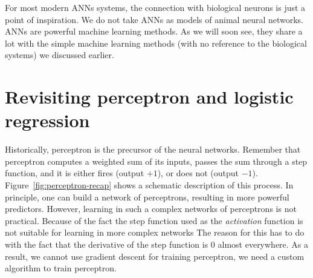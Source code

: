 For most modern ANNs systems,
the connection with biological neurons is just a point of inspiration.
We do not take ANNs as models of animal neural networks.
ANNs are powerful machine learning methods.
As we will soon see, they share a lot with the simple
machine learning methods (with no reference to the biological systems)
we discussed earlier.

\section{Revisiting perceptron and logistic regression}

\begin{marginfigure}
  \centering
  \caption{\label{fig:perceptron-recap}%
    A schematic representation of perceptron.
  }
\end{marginfigure}
Historically, perceptron is the precursor of the neural networks.
Remember that perceptron computes a weighted sum of its inputs,
passes the sum through a step function,
and it is either fires (output $+1$), or does not (output $-1$).
Figure~\ref{fig:perceptron-recap} shows a schematic description
of this process.
In principle, one can build a network of perceptrons, 
resulting in more powerful predictors.
However, learning in such a complex networks of perceptrons is not practical.
Because of the fact the step function used as the \emph{activation} function
is not suitable for learning in more complex networks%
The reason for this has to do with the fact
that the derivative of the step function is \num{0} almost everywhere.
As a result, we cannot use gradient descent for training perceptron,
we need a custom algorithm to train perceptron.


